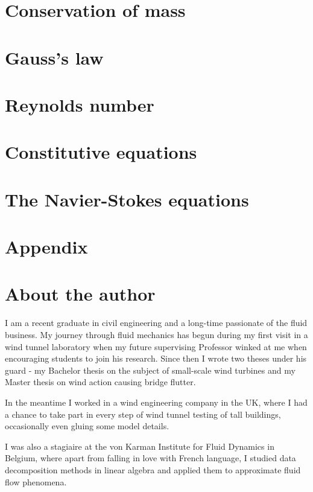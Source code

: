 \documentclass[10pt]{report}
\begin{document}
\chapter{Conservation of mass}




\chapter{Gauss's law}

\chapter{Reynolds number}

\chapter{Constitutive equations}

\chapter{The Navier-Stokes equations}



\chapter*{Appendix}

\newpage
\thispagestyle{empty}

\chapter*{About the author}

I am a recent graduate in civil engineering and a long-time passionate of the fluid business. My journey through fluid mechanics has begun during my first visit in a wind tunnel laboratory when my future supervising Professor winked at me when encouraging students to join his research. Since then I wrote two theses under his guard - my Bachelor thesis on the subject of small-scale wind turbines and my Master thesis on wind action causing bridge flutter.

In the meantime I worked in a wind engineering company in the UK, where I had a chance to take part in every step of wind tunnel testing of tall buildings, occasionally even gluing some model details.

I was also a stagiaire at the von Karman Institute for Fluid Dynamics in Belgium, where apart from falling in love with French language, I studied data decomposition methods in linear algebra and applied them to approximate fluid flow phenomena.
\end{document}
